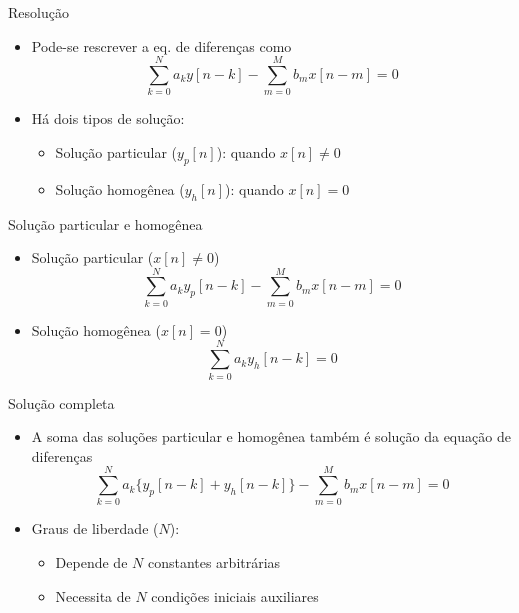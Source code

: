 \begin{slide}[toc=]{Resolução}
   \begin{itemize}
      \item Pode-se rescrever a eq. de diferenças como
      \begin{equation*}
         \sum_{ k = 0 }^{ N } a_k y[ n - k ]-\sum_{ m = 0 }^{ M } b_m x[ n - m ]=0
      \end{equation*}\pause
      \item Há dois tipos de solução:
      \begin{itemize}
         \item Solução particular ($y_p[n]$): quando $x[n]\neq 0$
         \item Solução homogênea ($y_h[n]$): quando $x[n]= 0$
      \end{itemize}
   \end{itemize}
\end{slide}

\begin{slide}[toc=]{Solução particular e homogênea}
   \begin{itemize}
      \item Solução particular ($x[n]\neq 0$)
      \begin{equation*}
         \sum_{ k = 0 }^{ N } a_k y_p[ n - k ]-\sum_{ m = 0 }^{ M } b_m x[ n - m ]=0
      \end{equation*}\pause
      \item Solução homogênea ($x[n]=0$)
      \begin{equation*}
         \sum_{ k = 0 }^{ N } a_k y_h[ n - k ]=0
      \end{equation*}
   \end{itemize}
\end{slide}

\begin{slide}[toc=]{Solução completa}
   \begin{itemize}
      \item A soma das soluções particular e homogênea também é solução da equação de diferenças
      \begin{equation*}
         \sum_{ k = 0 }^{ N } a_k \{y_p[ n - k ]+y_h[ n - k ]\}-\sum_{ m = 0 }^{ M } b_m x[ n - m]=0
      \end{equation*}\pause
      \item Graus de liberdade ($N$): 
      \begin{itemize}
         \item Depende de $N$ constantes arbitrárias
         \item Necessita de $N$ condições iniciais auxiliares
      \end{itemize}
   \end{itemize}
\end{slide}

